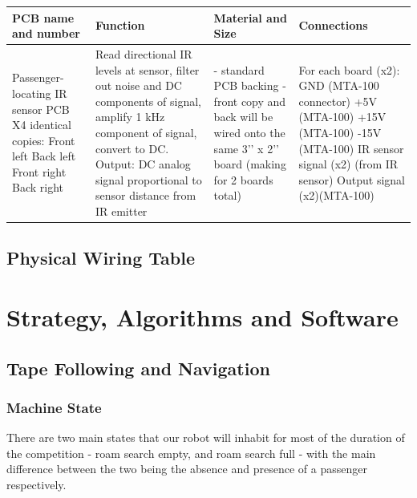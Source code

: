\documentclass[12pt]{article}
\begin{document}
\begin{longtable}{| L{7em} | L{7em} | L{7em} | L{7em}|}
\hline
PCB name and number & Function & Material and Size & Connections\\
\hline
Passenger-locating IR sensor PCB \newline X4 identical copies: \newline Front
left \newline Back left  \newline Front right  \newline Back right & Read directional IR levels at sensor, filter out noise and DC components of signal, amplify 1 kHz component of signal, convert to DC.
Output: DC analog signal proportional to sensor distance from IR emitter & - standard PCB backing
\newline - front copy and back will be wired onto the same 3’’ x 2’’ board
(making for 2 boards total) & For each board (x2): \newline GND (MTA-100
connector) \newline +5V (MTA-100) \newline +15V (MTA-100) \newline -15V
(MTA-100) \newline IR sensor signal \newline  (x2) (from IR sensor)
\newline Output signal (x2)(MTA-100)\\
\hline


\end{longtable}
\subsection{Physical Wiring Table}

\section{Strategy, Algorithms and Software}
\subsection{Tape Following and Navigation}
\subsubsection{Machine State}
There are two main states that our robot will inhabit for most of the duration
of the competition - roam search empty, and roam search full - with the main
difference between the two being the absence and presence of a passenger
respectively.\\
\end{document}
